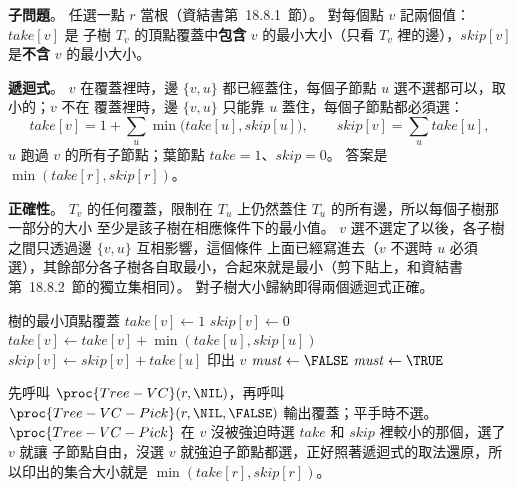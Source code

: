 \begin{pastsoln}
\textbf{子問題}。 任選一點 $r$ 當根（資結書第~18.8.1~節）。 對每個點 $v$ 記兩個值：$\mathit{take}[v]$ 是
子樹 $T_v$ 的頂點覆蓋中\textbf{包含} $v$ 的最小大小（只看 $T_v$ 裡的邊），$\mathit{skip}[v]$ 是\textbf{不含}
$v$ 的最小大小。

\textbf{遞迴式}。 $v$ 在覆蓋裡時，邊 $\{v, u\}$ 都已經蓋住，每個子節點 $u$ 選不選都可以，取小的；$v$ 不在
覆蓋裡時，邊 $\{v, u\}$ 只能靠 $u$ 蓋住，每個子節點都必須選：
\[
\mathit{take}[v] = 1 + \sum_{u} \min\bigl(\mathit{take}[u], \mathit{skip}[u]\bigr), \qquad
\mathit{skip}[v] = \sum_{u} \mathit{take}[u],
\]
$u$ 跑過 $v$ 的所有子節點；葉節點 $\mathit{take} = 1$、$\mathit{skip} = 0$。 答案是
$\min(\mathit{take}[r], \mathit{skip}[r])$。

\textbf{正確性}。 $T_v$ 的任何覆蓋，限制在 $T_u$ 上仍然蓋住 $T_u$ 的所有邊，所以每個子樹那一部分的大小
至少是該子樹在相應條件下的最小值。 $v$ 選不選定了以後，各子樹之間只透過邊 $\{v, u\}$ 互相影響，這個條件
上面已經寫進去（$v$ 不選時 $u$ 必須選），其餘部分各子樹各自取最小，合起來就是最小（剪下貼上，和資結書
第~18.8.2~節的獨立集相同）。 對子樹大小歸納即得兩個遞迴式正確。

\begin{pseudo}{樹的最小頂點覆蓋}
    \State $\mathit{take}[v] \gets 1$
    \State $\mathit{skip}[v] \gets 0$
            \State {}
            \State $\mathit{take}[v] \gets \mathit{take}[v] + \min(\mathit{take}[u], \mathit{skip}[u])$
            \State $\mathit{skip}[v] \gets \mathit{skip}[v] + \mathit{take}[u]$
        \EndIf
    \EndFor
\EndProcedure
\Statex
{} 
        \State 印出 $v$
        \State $\mathit{must} \gets \FALSE$
    \Else
        \State $\mathit{must} \gets \TRUE$ 
    \EndIf
            \State {}
        \EndIf
    \EndFor
\EndProcedure
\end{pseudo}

先呼叫 $\proc{Tree-VC}(r, \NIL)$，再呼叫 $\proc{Tree-VC-Pick}(r, \NIL, \FALSE)$ 輸出覆蓋；平手時不選。
$\proc{Tree-VC-Pick}$ 在 $v$ 沒被強迫時選 $\mathit{take}$ 和 $\mathit{skip}$ 裡較小的那個，選了 $v$ 就讓
子節點自由，沒選 $v$ 就強迫子節點都選，正好照著遞迴式的取法還原，所以印出的集合大小就是
$\min(\mathit{take}[r], \mathit{skip}[r])$。


\end{pastsoln}

